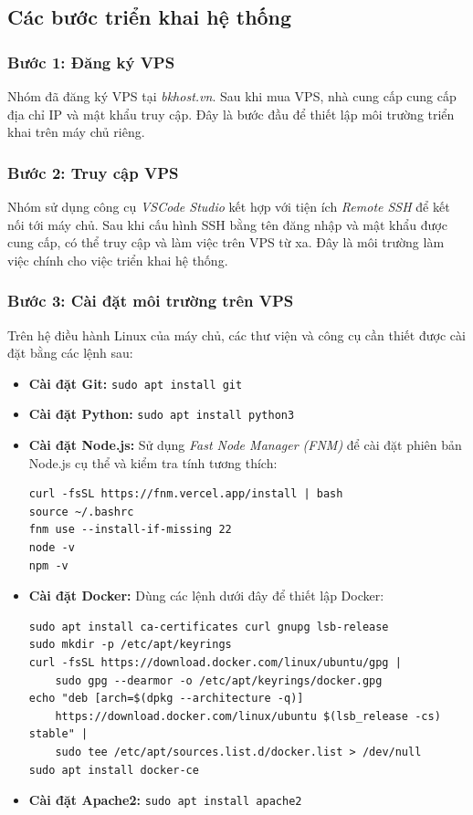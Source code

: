 \subsection{Các bước triển khai hệ thống}

\subsubsection{Bước 1: Đăng ký VPS}
Nhóm đã đăng ký VPS tại \textit{bkhost.vn}. Sau khi mua VPS, nhà cung cấp cung cấp địa chỉ IP và mật khẩu truy cập. Đây là bước đầu để thiết lập môi trường triển khai trên máy chủ riêng.

\subsubsection{Bước 2: Truy cập VPS}
Nhóm sử dụng công cụ \textit{VSCode Studio} kết hợp với tiện ích \textit{Remote SSH} để kết nối tới máy chủ. Sau khi cấu hình SSH bằng tên đăng nhập và mật khẩu được cung cấp, có thể truy cập và làm việc trên VPS từ xa. Đây là môi trường làm việc chính cho việc triển khai hệ thống.

\subsubsection{Bước 3: Cài đặt môi trường trên VPS}
Trên hệ điều hành Linux của máy chủ, các thư viện và công cụ cần thiết được cài đặt bằng các lệnh sau:
\begin{itemize}
    \item \textbf{Cài đặt Git:} \texttt{sudo apt install git}
    \item \textbf{Cài đặt Python:} \texttt{sudo apt install python3}
    \item \textbf{Cài đặt Node.js:} Sử dụng \textit{Fast Node Manager (FNM)} để cài đặt phiên bản Node.js cụ thể và kiểm tra tính tương thích:
    \begin{verbatim}
curl -fsSL https://fnm.vercel.app/install | bash
source ~/.bashrc
fnm use --install-if-missing 22
node -v
npm -v
    \end{verbatim}
    \item \textbf{Cài đặt Docker:} Dùng các lệnh dưới đây để thiết lập Docker:
    \begin{verbatim}
sudo apt install ca-certificates curl gnupg lsb-release
sudo mkdir -p /etc/apt/keyrings
curl -fsSL https://download.docker.com/linux/ubuntu/gpg | 
    sudo gpg --dearmor -o /etc/apt/keyrings/docker.gpg
echo "deb [arch=$(dpkg --architecture -q)] 
    https://download.docker.com/linux/ubuntu $(lsb_release -cs) stable" | 
    sudo tee /etc/apt/sources.list.d/docker.list > /dev/null
sudo apt install docker-ce
    \end{verbatim}
    \item \textbf{Cài đặt Apache2:} \texttt{sudo apt install apache2}
\end{itemize}


